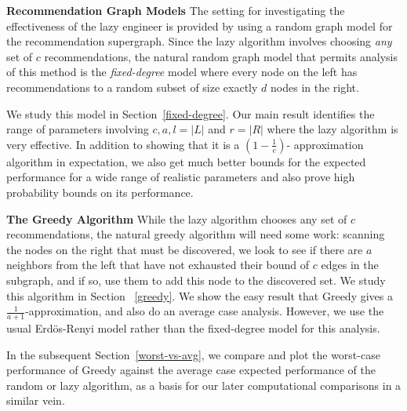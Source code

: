 {\bf Recommendation Graph Models}
The setting for investigating the effectiveness of the lazy engineer is provided
by using a random graph model for the recommendation supergraph. Since the lazy
algorithm involves choosing {\em any} set of $c$ recommendations, the natural
random graph model that permits analysis of this method is the {\em fixed-degree}
model where every node on the left has recommendations to a random subset of size
exactly $d$ nodes in the right. 

We study this model in Section~\ref{fixed-degree}. Our main result identifies
the range of parameters involving $c,a,l=|L|$ and $r =|R|$ where the lazy
algorithm is very effective. In addition to showing that it is a $(1-\frac1e)$-
approximation algorithm in expectation, we also get much better bounds for the
expected performance for a wide range of realistic parameters and also prove
high probability bounds on its performance. \vs

{\bf The Greedy Algorithm}
While the lazy algorithm chooses any set of $c$ recommendations, the natural
greedy algorithm will need some work: scanning the nodes on the right that must
be discovered, we look to see if there are $a$ neighbors from the left that have
not exhausted their bound of $c$ edges in the subgraph, and if so, use them to
add this node to the discovered set. We study this algorithm in Section
~\ref{greedy}. We show the easy result that Greedy gives a 
$\frac{1}{a+1}$-approximation, and also do an average case analysis. However, we
use the usual Erd\"os-Renyi model rather than the fixed-degree model for this
analysis.

In the subsequent Section~\ref{worst-vs-avg}, we compare and plot the worst-case
performance of Greedy against the average case expected performance of the random
or lazy algorithm, as a basis for our later computational comparisons in a
similar vein. \vs

